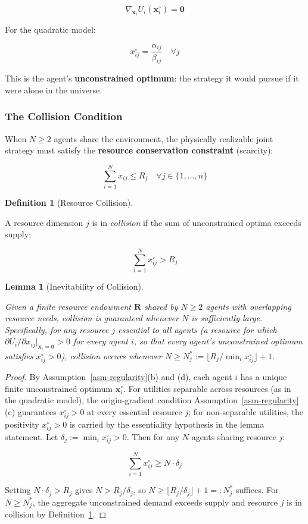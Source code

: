 \documentclass[11pt]{article}
\theoremstyle{plain}
\newtheorem{lemma}[theorem]{Lemma}
\theoremstyle{definition}
\newtheorem{definition}{Definition}
\theoremstyle{remark}
\let\origsubsubsection\subsubsection
\renewcommand{\subsubsection}{\needspace{4\baselineskip}\origsubsubsection}
\begin{document}
\[\nabla_{\mathbf{x}_i} U_i(\mathbf{x}_i^{\circ}) = \mathbf{0}\]

For the quadratic model:

\[x_{ij}^{\circ} = \frac{\alpha_{ij}}{\beta_{ij}} \quad \forall j\]

This is the agent's \textbf{unconstrained optimum}: the strategy it
would pursue if it were alone in the universe.

\subsubsection{The Collision Condition}\label{the-collision-condition}

When \(N \geq 2\) agents share the environment, the physically
realizable joint strategy must satisfy the \textbf{resource conservation
constraint} (scarcity):

\[\sum_{i=1}^{N} x_{ij} \leq R_j \quad \forall j \in \{1, \ldots, n\}\]

\begin{definition}[Resource Collision]
\label{def-resource-collision}

A resource dimension $j$ is in \emph{collision} if the sum of unconstrained optima exceeds supply:

$$\sum_{i=1}^{N} x_{ij}^{\circ} > R_j$$
\end{definition}

\begin{lemma}[Inevitability of Collision]
\label{lem-inevitability-collision}

Given a finite resource endowment $\mathbf{R}$ shared by $N \geq 2$ agents with overlapping resource needs, collision is guaranteed whenever $N$ is sufficiently large. Specifically, for any resource $j$ \emph{essential} to all agents (a resource for which $\partial U_i / \partial x_{ij} |_{\mathbf{x}_i = \mathbf{0}} > 0$ for every agent $i$, so that every agent's unconstrained optimum satisfies $x_{ij}^{\circ} > 0$), collision occurs whenever $N \geq N_j^* := \lfloor R_j / \min_i x_{ij}^{\circ} \rfloor + 1$.
\end{lemma}

\begin{proof}
By Assumption~\ref{asm-regularity}(b) and (d), each agent $i$ has a unique finite unconstrained optimum $\mathbf{x}_i^{\circ}$. For utilities separable across resources (as in the quadratic model), the origin-gradient condition Assumption~\ref{asm-regularity}(c) guarantees $x_{ij}^{\circ} > 0$ at every essential resource $j$; for non-separable utilities, the positivity $x_{ij}^{\circ} > 0$ is carried by the essentiality hypothesis in the lemma statement. Let $\delta_j := \min_{i} x_{ij}^{\circ} > 0$. Then for any $N$ agents sharing resource $j$:

$$\sum_{i=1}^{N} x_{ij}^{\circ} \geq N \cdot \delta_j$$

Setting $N \cdot \delta_j > R_j$ gives $N > R_j / \delta_j$, so $N \geq \lfloor R_j / \delta_j \rfloor + 1 =: N_j^*$ suffices. For $N \geq N_j^*$, the aggregate unconstrained demand exceeds supply and resource $j$ is in collision by Definition~\ref{def-resource-collision}.
\end{proof}
\end{document}
